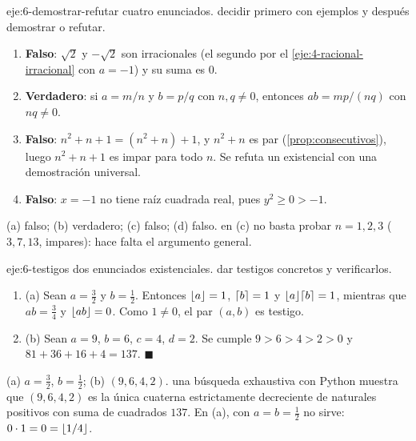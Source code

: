 \begin{solucion}{eje:6-demostrar-refutar}
\datos cuatro enunciados.
\planteamiento decidir primero con ejemplos y después demostrar o refutar.
\pasos
\begin{enumerate}[label=(\alph*)]
  \item \textbf{Falso}: $\sqrt2$ y $-\sqrt2$ son irracionales (el segundo por el \cref{eje:4-racional-irracional} con $a=-1$) y su suma es $0$.
  \item \textbf{Verdadero}: si $a=m/n$ y $b=p/q$ con $n,q\neq 0$, entonces $ab=mp/(nq)$ con $nq\neq 0$.
  \item \textbf{Falso}: $n^{2}+n+1=(n^{2}+n)+1$, y $n^{2}+n$ es par (\cref{prop:consecutivos}), luego $n^{2}+n+1$ es impar para todo $n$. Se refuta un existencial con una demostración universal.
  \item \textbf{Falso}: $x=-1$ no tiene raíz cuadrada real, pues $y^{2}\ge 0>-1$.
\end{enumerate}
\resultado (a) falso; (b) verdadero; (c) falso; (d) falso.
\comprobacion en (c) no basta probar $n=1,2,3$ ($3,7,13$, impares): hace falta el argumento general.
\end{solucion}

\begin{solucion}{eje:6-testigos}
\datos dos enunciados existenciales.
\planteamiento dar testigos concretos y verificarlos.
\pasos
\begin{enumerate}[label=\arabic*.]
  \item (a) Sean $a=\tfrac32$ y $b=\tfrac12$. Entonces $\lfloor a\rfloor=1$, $\lceil b\rceil=1$ y $\lfloor a\rfloor\lceil b\rceil=1$, mientras que $ab=\tfrac34$ y $\lfloor ab\rfloor=0$. Como $1\neq 0$, el par $(a,b)$ es testigo.
  \item (b) Sean $a=9$, $b=6$, $c=4$, $d=2$. Se cumple $9>6>4>2>0$ y $81+36+16+4=137$. $\blacksquare$
\end{enumerate}
\resultado (a) $a=\tfrac32$, $b=\tfrac12$; (b) $(9,6,4,2)$.
\comprobacion una búsqueda exhaustiva con Python muestra que $(9,6,4,2)$ es la única cuaterna estrictamente decreciente de naturales positivos con suma de cuadrados $137$. En (a), con $a=b=\tfrac12$ no sirve: $0\cdot 1=0=\lfloor1/4\rfloor$.
\end{solucion}


